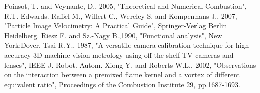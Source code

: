 \documentclass[10pt,fleqn,a4paper]{article}
\begin{document}
\begin{thebibliography}{1}
 Poinsot, T. and Veynante, D., 2005, "Theoretical and Numerical Combustion",  R.T. Edwards.
 Raffel M., Willert C., Wereley S. and Kompenhans J., 2007, "Particle Image Velocimetry: A Practical Guide", Springer-Verlag Berlin Heidelberg.
 Riesz F. and Sz.-Nagy B.,1990, "Functional analysis", New York:Dover.
 Tsai R.Y., 1987, "A versatile camera calibration technique for high-accuracy 3D machine vision metrology using off-the-shelf TV cameras and lenses", IEEE J. Robot. Autom.
 Xiong Y. and Roberts W.L., 2002, "Observations on the interaction between a premixed flame kernel and a vortex of different equivalent ratio", Proceedings of the Combustion Institute 29, pp.1687-1693.

\end{thebibliography}
\end{document}

